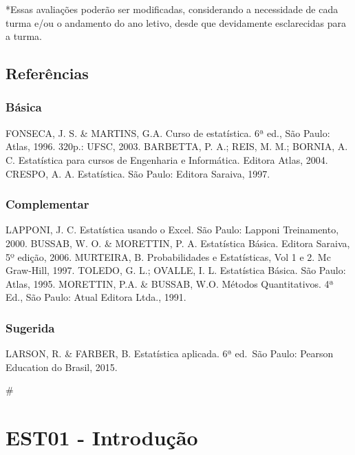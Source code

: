 \documentclass[
]{book}
\begin{document}
*Essas avaliações poderão ser modificadas, considerando a necessidade de cada turma e/ou o andamento do ano letivo, desde que devidamente esclarecidas para a turma.

\hypertarget{referuxeancias}{%
\section*{Referências}\label{referuxeancias}}

\hypertarget{buxe1sica}{%
\subsection*{Básica}\label{buxe1sica}}

FONSECA, J. S. \& MARTINS, G.A. Curso de estatística. 6ª ed., São Paulo: Atlas, 1996. 320p.: UFSC, 2003.
BARBETTA, P. A.; REIS, M. M.; BORNIA, A. C. Estatística para cursos de Engenharia e Informática. Editora Atlas, 2004.
CRESPO, A. A. Estatística. São Paulo: Editora Saraiva, 1997.

\hypertarget{complementar}{%
\subsection*{Complementar}\label{complementar}}

LAPPONI, J. C. Estatística usando o Excel. São Paulo: Lapponi Treinamento, 2000.
BUSSAB, W. O. \& MORETTIN, P. A. Estatística Básica. Editora Saraiva, 5º edição, 2006.
MURTEIRA, B. Probabilidades e Estatísticas, Vol 1 e 2. Mc Graw-Hill, 1997.
TOLEDO, G. L.; OVALLE, I. L. Estatística Básica. São Paulo: Atlas, 1995.
MORETTIN, P.A. \& BUSSAB, W.O. Métodos Quantitativos. 4ª Ed., São Paulo: Atual Editora Ltda., 1991.

\hypertarget{sugerida}{%
\subsection*{Sugerida}\label{sugerida}}

LARSON, R. \& FARBER, B. Estatística aplicada. 6ª ed.~São Paulo: Pearson Education do Brasil, 2015.

\#\citep{barbetta2004estatistica}

\hypertarget{est01---introduuxe7uxe3o}{%
\chapter{EST01 - Introdução}\label{est01---introduuxe7uxe3o}}
\end{document}
